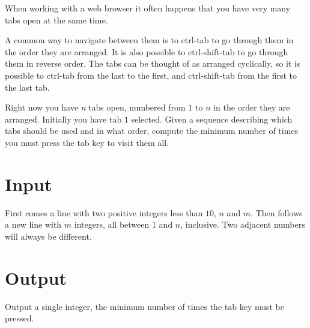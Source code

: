 
When working with a web browser it often happens that you have very many
tabs open at the same time.

A common way to navigate between them is to ctrl-tab to go through them in
the order they are arranged. It is also possible to ctrl-shift-tab to go through
them in reverse order. The tabs can be thought of as arranged cyclically, so it is possible to ctrl-tab from the last to the first, and ctrl-shift-tab from the first to the last tab. 

Right now you have \emph{n} tabs open, numbered from $1$ to $n$ in the order
they are arranged. Initially you have tab $1$ selected. Given a sequence
describing which tabs should be used and in what order, compute the minimum number of
times you must press the tab key to visit them all.

\section*{Input}

First comes a line with two positive integers less than $10$, $n$ and $m$. Then
follows a new line with $m$ integers, all between $1$ and $n$, inclusive. Two
adjacent numbers will always be different.

\section*{Output}

Output a single integer, the minimum number of times the tab key must be pressed.
